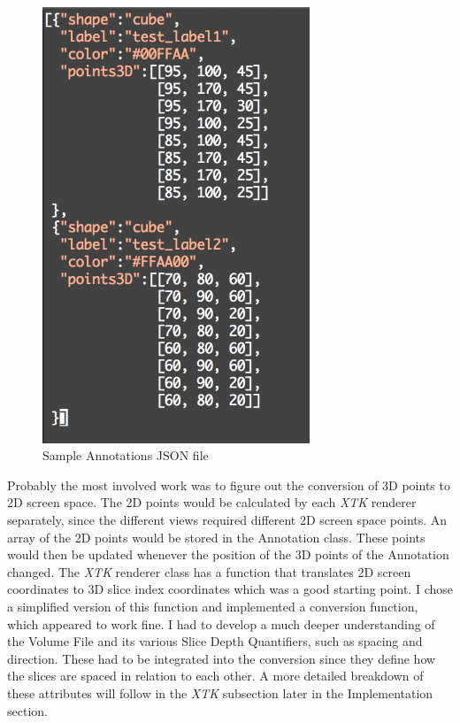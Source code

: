 \documentclass[a4paper,11pt,twoside]{article}
\begin{document}
\begin{figure}[ht!]
\centering
\includegraphics[width=80mm]{graphics/AnnoJSON_01.png}
\caption{Sample Annotations JSON file}
\label{fig:UIdesign1}
\end{figure}



Probably the most involved work was to figure out the conversion of 3D points to 2D screen space. The 2D points would be calculated by each \textit{XTK} renderer separately, since the different views required different 2D screen space points. An array of the 2D points would be stored in the Annotation class. These points would then be updated whenever the position of the 3D points of the Annotation changed. The \textit{XTK} renderer class has a function that translates 2D screen coordinates to 3D slice index coordinates which was a good starting point. I chose a simplified version of this function and implemented a conversion function, which appeared to work fine. I had to develop a much deeper understanding of the Volume File and its various Slice Depth Quantifiers, such as spacing and direction. These had to be integrated into the conversion since they define how the slices are spaced in relation to each other. A more detailed breakdown of these attributes will follow in the \textit{XTK} subsection later in the Implementation section.
\end{document}
